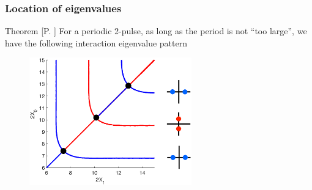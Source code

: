 \documentclass[16pt]{beamer}
\begin{document}
\begin{frame}
\frametitle{Location of eigenvalues} 
	\fontsize{14}{7.2}\selectfont
    \begin{block}{Theorem [P. ]}
    For a periodic 2-pulse, as long as the period is not ``too large'', we have the following interaction eigenvalue pattern
    	\begin{figure}
		\begin{center}
		\includegraphics[width=7cm]{images/2periodiceigpattern.eps}
		\end{center}
		\end{figure}
    \end{block}
\end{frame}
\end{document}
